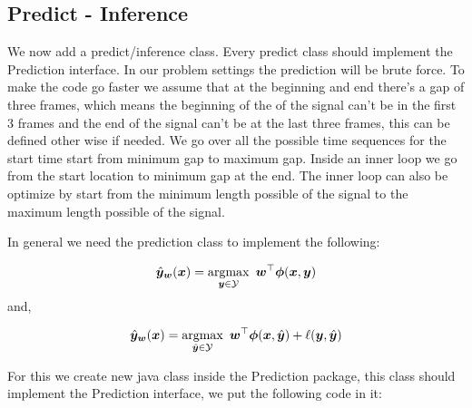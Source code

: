 \documentclass[11pt, oneside]{article}   	%
\begin{document}
\subsection{Predict - Inference}
We now add a predict/inference class. Every predict class should implement the Prediction interface. In our problem settings the prediction will be brute force. To make the code go faster we assume that at the beginning and end there's a gap of three frames, which means the beginning of the of the signal can't be in the first 3 frames and the end of the signal can't be at the last three frames, this can be defined other wise if needed. We go over all the possible time sequences for the start time start from minimum gap to maximum gap. Inside an inner loop we go from the start location to minimum gap at the end. The inner loop can also be optimize by start from the minimum length possible of the signal to the maximum length possible of the signal.

In general we need the prediction class to implement the following:

\begin{equation}
\label{eq:decoding}
\hat{\bm{y}}_{\bm{w}}(\bm{x}) = \operatorname*{argmax}_{\bm{y} \in \mathcal{Y}} ~ \bm{w}^\top \bm{\phi}(\bm{x}, \bm{y})
\end{equation}
and,

\begin{equation}
\label{eq:augmented-loss}
\hat{\bm{y}}_{\bm{w}}(\bm{x}) = \operatorname*{argmax}_{\hat{\bm{y}} \in \mathcal{Y}} ~ \bm{w}^\top \bm{\phi}(\bm{x}, \hat{\bm{y}}) + \ell (\bm{y},\hat{\bm{y}})
\end{equation}

For this we create new java class inside the Prediction package, this class should implement the Prediction interface, we put the following code in it:
\end{document}
